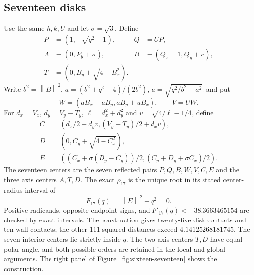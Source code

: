 \documentclass[11pt]{amsart}
\theoremstyle{definition}
\theoremstyle{remark}
\newcommand{\norm}[1]{\left\lVert #1\right\rVert}
\newcommand{\rhoSeventeen}{\rho_{17}}
\begin{document}
\subsection{Seventeen disks}\label{sec:seventeen}
Use the same $h,k,U$ and let $\sigma=\sqrt3$. Define
\begin{align*}
P&=(1,-\sqrt{q^2-1}), & Q&=UP,\\
A&=(0,P_y+\sigma), & B&=(Q_x-1,Q_y+\sigma),\\
T&=(0,B_y+\sqrt{4-B_x^2}).
\end{align*}
Write $b^2=\norm B^2$, $a=(b^2+q^2-4)/(2b^2)$,
$u=\sqrt{q^2/b^2-a^2}$, and put
\[
 W=(aB_x-uB_y,aB_y+uB_x),\qquad V=UW.
\]
For $d_x=V_x$, $d_y=V_y-T_y$, $\ell=d_x^2+d_y^2$ and
$v=\sqrt{4/\ell-1/4}$, define
\begin{align*}
C&=(d_x/2-d_yv,(V_y+T_y)/2+d_xv),\\
D&=(0,C_y+\sqrt{4-C_x^2}),\\
E&=((C_x+\sigma(D_y-C_y))/2,(C_y+D_y+\sigma C_x)/2).
\end{align*}
The seventeen centers are the seven reflected pairs
$P,Q,B,W,V,C,E$ and the three axis centers $A,T,D$.
The exact $\rhoSeventeen$ is the unique root in its stated center-radius
interval of
\[
 F_{17}(q)=\norm E^2-q^2=0.
\]
Positive radicands, opposite endpoint signs, and $F'_{17}(q)<-38.3663465154$
are checked by exact intervals. The construction gives twenty-five disk
contacts and ten wall contacts; the other 111 squared distances exceed
$4.14125268181745$. The seven interior centers lie strictly inside $q$.
The two axis centers $T,D$ have equal polar angle, and both possible orders
are retained in the local and global arguments.
The right panel of Figure~\ref{fig:sixteen-seventeen} shows the construction.
\end{document}
